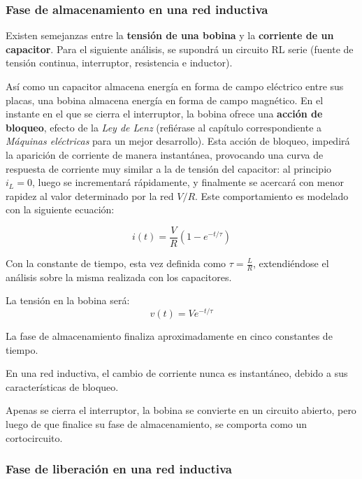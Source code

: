 \subsubsection{Fase de almacenamiento en una red inductiva}

Existen semejanzas entre la \textbf{tensión de una bobina} y la \textbf{corriente de un capacitor}. Para el siguiente análisis, se supondrá un circuito RL serie (fuente de tensión continua, interruptor, resistencia e inductor).

Así como un capacitor almacena energía en forma de campo eléctrico entre sus placas, una bobina almacena energía en forma de campo magnético. En el instante en el que se cierra el interruptor, la bobina ofrece una \textbf{acción de bloqueo}, efecto de la \textit{Ley de Lenz} (refiérase al capítulo correspondiente a \textit{Máquinas eléctricas} para un mejor desarrollo). Esta acción de bloqueo, impedirá la aparición de corriente de manera instantánea, provocando una curva de respuesta de corriente muy similar a la de tensión del capacitor: al principio $i_L = 0$, luego se incrementará rápidamente, y finalmente se acercará con menor rapidez al valor determinado por la red $V/R$. Este comportamiento es modelado con la siguiente ecuación:


\begin{equation}
	\label{eq:almacenamiento_inductor_i}
	i(t)=\frac{V}{R}(1-e^{-t / \tau})
\end{equation}

Con la constante de tiempo, esta vez definida como $\tau = \frac{L}{R} $, extendiéndose el análisis sobre la misma realizada con los capacitores.

La tensión en la bobina será:
\begin{equation}
	\label{eq:almacenamiento_inductor_v}
	v(t)=Ve^{-t / \tau}
\end{equation}

\begin{conclusiones}
	La fase de almacenamiento finaliza aproximadamente en cinco constantes de tiempo.
	
	En una red inductiva, el cambio de corriente nunca es instantáneo, debido a sus características de bloqueo.
	
	Apenas se cierra el interruptor, la bobina se convierte en un circuito abierto, pero luego de que finalice su fase de almacenamiento, se comporta como un cortocircuito.
\end{conclusiones}

\subsubsection{Fase de liberación en una red inductiva}

